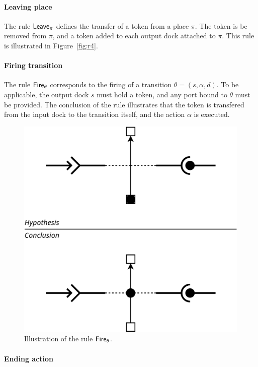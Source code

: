 {\begin{figure}[t]
\begin{minipage}[h]{0.45\columnwidth}
\end{minipage}
\end{figure}

\paragraph{Leaving place}{
  
The rule $\mathsf{Leave}_\pi$ defines the transfer of a token from a place
$\pi$. The token is be removed from $\pi$, and a token added to each
output dock attached to $\pi$. This rule is illustrated in
Figure~\ref{fig:r4}.

}

\paragraph{Firing transition}{

The rule $\mathsf{Fire}_\theta$ corresponds to the firing of a transition
$\theta = (s, \alpha, d)$. To be applicable, the output dock $s$ must
hold a token, and any port bound to $\theta$ must be provided. The
conclusion of the rule illustrates that the token is transfered from
the input dock to the transition itself, and the action $\alpha$ is
executed.

\begin{figure}[t]
\begin{center}
  \includegraphics[width=0.55\columnwidth]{./images/firing.pdf}
\end{center}
\caption{Illustration of the rule $\mathsf{Fire}_\theta$.}
\label{fig:r1}
\end{figure}

}

\paragraph{Ending action}{

}}
